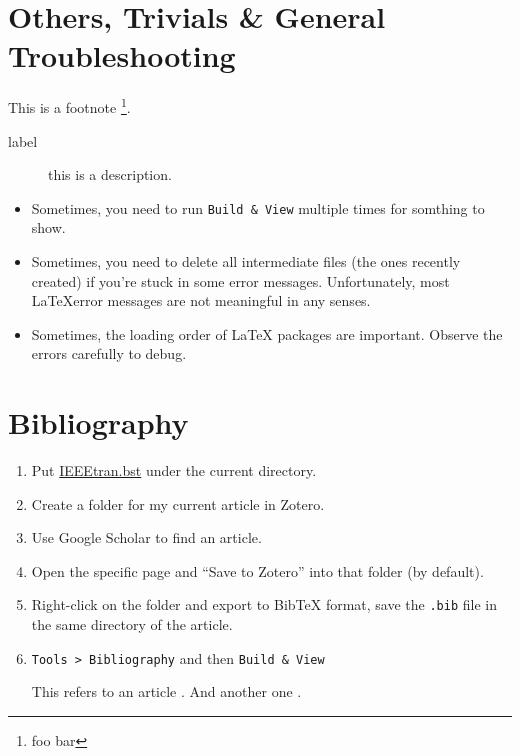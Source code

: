 \documentclass[a4paper]{article}
\begin{document}
\section{Others, Trivials \& General Troubleshooting}
\noindent

This is a footnote \footnote{foo bar}.\\
\begin{description}
\item[label] this is a description.
\end{description}
\begin{itemize}
\item Sometimes, you need to run \texttt{Build \& View} multiple times for somthing to show.
\item Sometimes, you need to delete all intermediate files (the ones recently created) if you're stuck in some error messages. Unfortunately, most \LaTeX error messages are not meaningful in any senses.
\item Sometimes, the loading order of \LaTeX{} packages are important. Observe the errors carefully to debug.
\end{itemize}


\section{Bibliography}

\begin{enumerate}
\item Put \href{https://www.ctan.org/tex-archive/biblio/bibtex/contrib/IEEEtran/IEEEtran.bst}{IEEEtran.bst} under the current directory.
\item Create a folder for my current article in Zotero.
\item Use Google Scholar to find an article.
\item Open the specific page and ``Save to Zotero'' into that folder (by default).
\item Right-click on the folder and export to BibTeX format, save the \texttt{.bib} file in the same directory of the article.
\item \texttt{Tools > Bibliography} and then \texttt{Build \& View}

This refers to an article \cite{li_cutpaste_2021}. And another one \cite{yang_learning_2021}.
\end{enumerate}



\end{document}
